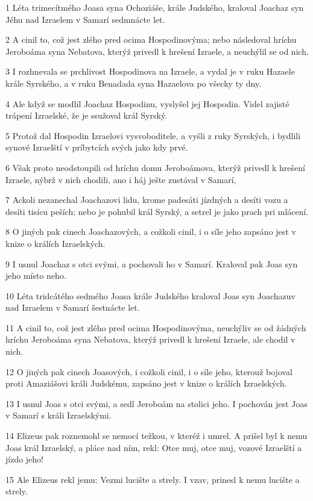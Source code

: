 \par 1 Léta trimecítmého Joasa syna Ochoziáše, krále Judského, kraloval Joachaz syn Jéhu nad Izraelem v Samarí sedmnácte let.
\par 2 A cinil to, což jest zlého pred ocima Hospodinovýma; nebo následoval hríchu Jeroboáma syna Nebatova, kterýž privedl k hrešení Izraele, a neuchýlil se od nich.
\par 3 I rozhnevala se prchlivost Hospodinova na Izraele, a vydal je v ruku Hazaele krále Syrského, a v ruku Benadada syna Hazaelova po všecky ty dny.
\par 4 Ale když se modlil Joachaz Hospodinu, vyslyšel jej Hospodin. Videl zajisté trápení Izraelské, že je ssužoval král Syrský.
\par 5 Protož dal Hospodin Izraelovi vysvoboditele, a vyšli z ruky Syrských, i bydlili synové Izraelští v príbytcích svých jako kdy prvé.
\par 6 Však proto neodstoupili od hríchu domu Jeroboámova, kterýž privedl k hrešení Izraele, nýbrž v nich chodili, ano i háj ješte zustával v Samarí,
\par 7 Ackoli nezanechal Joachazovi lidu, krome padesáti jízdných a desíti vozu a desíti tisícu peších; nebo je pohubil král Syrský, a setrel je jako prach pri mlácení.
\par 8 O jiných pak cinech Joachazových, a cožkoli cinil, i o síle jeho zapsáno jest v knize o králích Izraelských.
\par 9 I usnul Joachaz s otci svými, a pochovali ho v Samarí. Kraloval pak Joas syn jeho místo neho.
\par 10 Léta tridcátého sedmého Joasa krále Judského kraloval Joas syn Joachazuv nad Izraelem v Samarí šestnácte let.
\par 11 A cinil to, což jest zlého pred ocima Hospodinovýma, neuchýliv se od žádných hríchu Jeroboáma syna Nebatova, kterýž privedl k hrešení Izraele, ale chodil v nich.
\par 12 O jiných pak cinech Joasových, i cožkoli cinil, i o síle jeho, kterouž bojoval proti Amaziášovi králi Judskému, zapsáno jest v knize o králích Izraelských.
\par 13 I usnul Joas s otci svými, a sedl Jeroboám na stolici jeho. I pochován jest Joas v Samarí s králi Izraelskými.
\par 14 Elizeus pak roznemohl se nemocí težkou, v kteréž i umrel. A prišel byl k nemu Joas král Izraelský, a pláce nad ním, rekl: Otce muj, otce muj, vozové Izraelští a jízdo jeho!
\par 15 Ale Elizeus rekl jemu: Vezmi lucište a strely. I vzav, prinesl k nemu lucište a strely.
